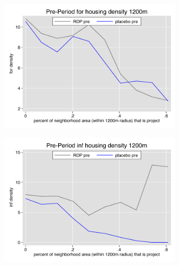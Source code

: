 \documentclass[12pt]{article}
\begin{document}
\pagebreak





\begin{figure}
        \begin{subfigure}[b]{0.495\textwidth}
            \centering
            \includegraphics[width=\textwidth,trim={0.3cm .3cm 0.1cm 0cm}, clip=true]{figures/overlap_for_1200_local_pre.pdf}
        \end{subfigure}
        \hfill
        \begin{subfigure}[b]{0.495\textwidth}  
            \centering 
            \includegraphics[width=\textwidth,trim={0.3cm .3cm 0.1cm 0cm}, clip=true]{figures/overlap_inf_1200_local_pre.pdf}

\end{subfigure}
\end{figure}
\end{document}
